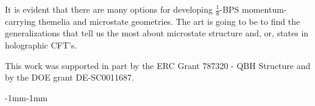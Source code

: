 \documentclass[11pt]{article}
\def\nBPS#1{$\frac{1}{#1}$-BPS}
\numberwithin{equation}{section}
\begin{document}
It is evident that there are many options for developing \nBPS{8} momentum-carrying themelia and microstate geometries.  The art is going to be to find the generalizations that tell us the most about microstate structure and, or, states in holographic CFT's. 


\vspace{1em} 
 This work was supported in part by the ERC Grant 787320 - QBH Structure and by the DOE grant DE-SC0011687.  



\begin{adjustwidth}{-1mm}{-1mm} %


      

      


\end{adjustwidth}


\end{document}
